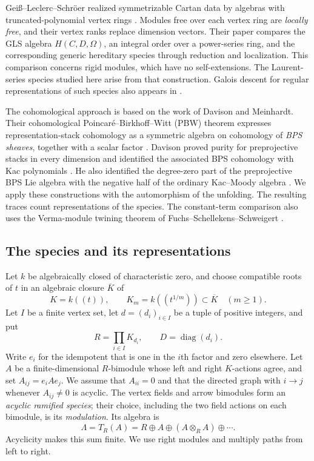 \documentclass[11pt, reqno]{amsart}
\numberwithin{equation}{section}
\theoremstyle{definition}
\theoremstyle{remark}
\newcommand{\op}[1]{\operatorname{#1}}
\newcommand{\Kbar}{\overline K}
\begin{document}
Gei\ss--Leclerc--Schr\"oer realized symmetrizable Cartan data by
algebras with truncated-polynomial vertex rings \cite{GLSI,GLSII}.
Modules free over each vertex ring are \emph{locally free}, and their
vertex ranks replace dimension vectors. Their paper \cite{GLSrigid} 
compares the GLS algebra $H(C,D,\Omega)$, an integral order over a
power-series ring, and the corresponding generic hereditary species
through reduction and localization. This comparison concerns rigid modules,
which have no self-extensions. The Laurent-series species studied here
arise from that construction. Galois descent for regular representations
of such species also appears in \cite{GR,GRR}.

The cohomological approach is based on the work of Davison and
Meinhardt. Their cohomological Poincar\'e--Birkhoff--Witt (PBW) theorem
expresses representation-stack cohomology as a symmetric algebra on
cohomology of \emph{BPS sheaves}, together with a scalar factor
\cite{DM}. Davison proved purity for preprojective stacks in every
dimension and identified the associated BPS cohomology with Kac
polynomials \cite{DavisonStacks}. He also identified the degree-zero
part of the preprojective BPS Lie algebra with the negative half of the
ordinary Kac--Moody algebra \cite[Theorem~6.6]{DavisonBPS}.
We apply these constructions with the automorphism of the unfolding.
The resulting traces count
representations of the species. The constant-term comparison also uses
the Verma-module twining theorem of Fuchs--Schellekens--Schweigert
\cite{FSS}.

\subsection*{The species and its representations}
Let $k$ be algebraically closed of characteristic zero, and choose
compatible roots of $t$ in an algebraic closure $\Kbar$ of
\[ K=k((t)),\qquad K_m=k((t^{1/m}))\subset\Kbar\quad(m\ge1). \]
Let $I$ be a finite vertex set, let $d=(d_i)_{i\in I}$ be a tuple of
positive integers, and put
\[ R=\prod_{i\in I}K_{d_i},\qquad D=\op{diag}(d_i). \]
Write $e_i$ for the idempotent that is one in the $i$th factor and zero
elsewhere. Let $A$ be a finite-dimensional $R$-bimodule whose left and
right $K$-actions agree, and set $A_{ij}=e_iAe_j$. We assume that
$A_{ii}=0$ and that the directed graph with $i\to j$ whenever
$A_{ij}\ne0$ is acyclic. The vertex fields and arrow bimodules form an
\emph{acyclic ramified species}; their choice, including the two field
actions on each bimodule, is its \emph{modulation}. Its algebra is
\[ \Lambda=T_R(A)=R\oplus A\oplus(A\otimes_R A)\oplus\cdots . \]
Acyclicity makes this sum finite. We use right modules and multiply
paths from left to right.
\end{document}
